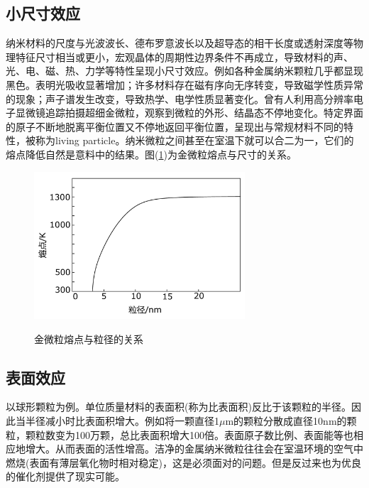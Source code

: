 \documentclass[a4paper]{article}
\begin{document}
\subsection{小尺寸效应}
纳米材料的尺度与光波波长、德布罗意波长以及超导态的相干长度或透射深度等物理特征尺寸相当或更小，宏观晶体的周期性边界条件不再成立，导致材料的声、光、电、磁、热、力学等特性呈现小尺寸效应。例如各种金属纳米颗粒几乎都显现黑色。表明光吸收显著增加；许多材料存在磁有序向无序转变，导致磁学性质异常的现象；声子谱发生改变，导致热学、电学性质显著变化。曾有人利用高分辨率电子显微镜追踪拍摄超细金微粒，观察到微粒的外形、结晶态不停地变化。特定界面的原子不断地脱离平衡位置又不停地返回平衡位置，呈现出与常规材料不同的特性，被称为living particle。纳米微粒之间甚至在室温下就可以合二为一，它们的熔点降低自然是意料中的结果。图(\ref{fig2})为金微粒熔点与尺寸的关系。
\begin{figure}[!ht]
\centering
\includegraphics[width=0.7\textwidth]{fig/fig2.pdf}\\
\caption{金微粒熔点与粒径的关系}\label{fig2}
\end{figure}

\subsection{表面效应}
以球形颗粒为例。单位质量材料的表面积(称为比表面积)反比于该颗粒的半径。因此当半径减小时比表面积增大。例如将一颗直径1$\mu$m的颗粒分散成直径10nm的颗粒，颗粒数变为100万颗，总比表面积增大100倍。表面原子数比例、表面能等也相应地增大。从而表面的活性增高。洁净的金属纳米微粒往往会在室温环境的空气中燃烧(表面有薄层氧化物时相对稳定)，这是必须面对的问题。但是反过来也为优良的催化剂提供了现实可能。
\end{document}
